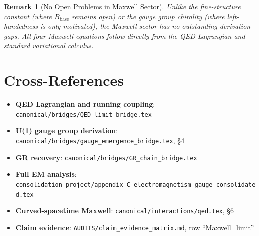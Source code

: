 \documentclass[11pt,a4paper]{article}
\newtheorem{remark}{Remark}
\newcommand{\Bbase}{B_{\mathrm{base}}}
\begin{document}
\begin{remark}[No Open Problems in Maxwell Sector]
Unlike the fine-structure constant (where $\Bbase$ remains open) or the
gauge group chirality (where left-handedness is only motivated), the Maxwell
sector has no outstanding derivation gaps. All four Maxwell equations follow
directly from the QED Lagrangian and standard variational calculus.
\end{remark}

\section{Cross-References}

\begin{itemize}
  \item \textbf{QED Lagrangian and running coupling}: \texttt{canonical/bridges/QED\_limit\_bridge.tex}
  \item \textbf{U(1) gauge group derivation}: \texttt{canonical/bridges/gauge\_emergence\_bridge.tex}, \S4
  \item \textbf{GR recovery}: \texttt{canonical/bridges/GR\_chain\_bridge.tex}
  \item \textbf{Full EM analysis}: \texttt{consolidation\_project/appendix\_C\_electromagnetism\_gauge\_consolidated.tex}
  \item \textbf{Curved-spacetime Maxwell}: \texttt{canonical/interactions/qed.tex}, \S6
  \item \textbf{Claim evidence}: \texttt{AUDITS/claim\_evidence\_matrix.md}, row ``Maxwell\_limit''
\end{itemize}
\end{document}
